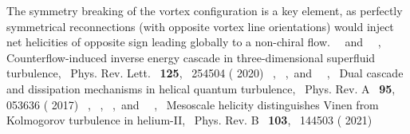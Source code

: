 \documentclass[%
 reprint,
 amsmath,amssymb,
 aps,
 prl,
]{revtex4-2}
\begin{document}
{\begin{thebibliography}{55}
      \BibitemOpen
      \href@noop {} { {The symmetry breaking of the vortex configuration is a key element, as perfectly symmetrical reconnections (with opposite vortex line orientations) would inject net helicities of opposite sign leading globally to a non-chiral flow.}}%
      \BibitemOpen
       { {~}\ and\  {~},\ } { {Counterflow-induced inverse energy cascade in three-dimensional superfluid turbulence},\ }\href@noop {} { { {Phys. Rev. Lett.}\ }\textbf { {125}},\  {254504} ( {2020})}%
      \BibitemOpen
       { {~},  {~},\ and\  {\ },\ } { {Dual cascade and dissipation mechanisms in helical quantum turbulence},\ }\href@noop {} { { {Phys. Rev. A}\ }\textbf { {95}},\  {053636} ( {2017})}%
      \BibitemOpen
       { {~},  {~},  {~},\ and\  {~},\ } { {Mesoscale helicity distinguishes {{Vinen}} from {{Kolmogorov}} turbulence in helium-{{II}}},\ }\href@noop {} { { {Phys. Rev. B}\ }\textbf { {103}},\  {144503} ( {2021})}%

\end{thebibliography}}
\end{document}
